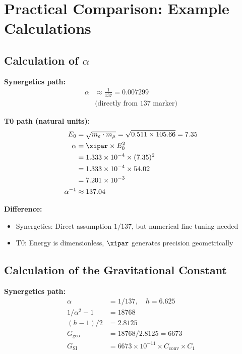	\section{Practical Comparison: Example Calculations}
	
	\subsection{Calculation of $\alpha$}
	
	\textbf{Synergetics path:}
	\begin{align}
		\alpha &\approx \frac{1}{137} = 0.007299 \\
		&\text{(directly from 137 marker)}
	\end{align}
	
	\textbf{T0 path (natural units):}
	\begin{align}
		E_0 &= \sqrt{m_e \cdot m_\mu} = \sqrt{0.511 \times 105.66} = 7.35 \\
		\alpha &= \xipar \times E_0^2 \\
		&= 1.333 \times 10^{-4} \times (7.35)^2 \\
		&= 1.333 \times 10^{-4} \times 54.02 \\
		&= 7.201 \times 10^{-3} \\
		\alpha^{-1} &\approx 137.04
	\end{align}
	
	\textbf{Difference:}
	\begin{itemize}
		\item Synergetics: Direct assumption $1/137$, but numerical fine-tuning needed
		\item T0: Energy is dimensionless, $\xipar$ generates precision geometrically
	\end{itemize}
	
	\subsection{Calculation of the Gravitational Constant}
	
	\textbf{Synergetics path:}
	\begin{align}
		\alpha &= 1/137, \quad h = 6.625 \\
		1/\alpha^2 - 1 &= 18768 \\
		(h-1)/2 &= 2.8125 \\
		G_{\text{geo}} &= 18768 / 2.8125 = 6673 \\
		G_{\text{SI}} &= 6673 \times 10^{-11} \times C_{\text{conv}} \times C_1
	\end{align}
	
